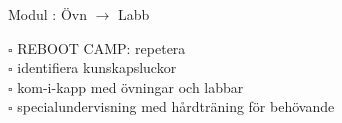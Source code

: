 
Modul : Övn  $\rightarrow$ Labb 
\begin{multicols}{3}\SlideFontTiny
$\square$ REBOOT CAMP: repetera \\
$\square$ identifiera kunskapsluckor \\
$\square$ kom-i-kapp med övningar och labbar \\
$\square$ specialundervisning med hårdträning för behövande \\     
\end{multicols}
